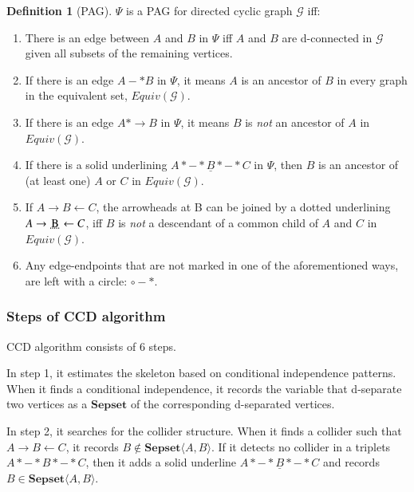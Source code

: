 \documentclass[11pt]{article}
\newcommand{\udensdot}[1]{%
    \tikz[baseline=(todotted.base)]{
        \node[inner sep=1pt,outer sep=0pt] (todotted) {#1};
        \draw[densely dotted, thick] (todotted.south west) -- (todotted.south east);
    }%
}%
\theoremstyle{definition}
\newtheorem{definition}{Definition}
\begin{document}
\begin{definition} [PAG] \label{def: def2}
$\Psi$ is a PAG for directed cyclic graph $\mathcal{G}$ iff:
\begin{enumerate}[nolistsep]
    \item There is an edge between $A$ and $B$ in $\Psi$ iff $A$ and $B$ are d-connected in $\mathcal{G}$ given all subsets of the remaining vertices.
    
    \item If there is an edge $A -* B$ in $\Psi$, it means $A$ is an ancestor of $B$ in every graph in the equivalent set, $Equiv(\mathcal{G})$.

    \item If there is an edge $A *\rightarrow B$ in $\Psi$, it means $B$ is \textit{not} an ancestor of $A$ in $Equiv(\mathcal{G})$.

    \item If there is a solid underlining $A *-* \underline{B}*-*C$ in $\Psi$, then $B$ is an ancestor of (at least one) $A$ or $C$ in $Equiv(\mathcal{G})$.

    \item If $A \rightarrow B \leftarrow C$, the arrowheads at B can be joined by a dotted underlining $A \rightarrow \udensdot{B} \leftarrow C$, iff $B$ is \textit{not} a descendant of a common child of $A$ and $C$ in $Equiv(\mathcal{G})$.

    \item Any edge-endpoints that are not marked in one of the aforementioned ways, are left with a circle: $\circ-*$.
    
\end{enumerate}
\end{definition}

\subsubsection{Steps of CCD algorithm}
CCD algorithm consists of 6 steps.

In step 1, it estimates the skeleton based on conditional independence patterns. When it finds a conditional independence, it records the variable that d-separate two vertices as a $\mathbf{Sepset}$ of the corresponding d-separated vertices. 

In step 2, it searches for the collider structure. When it finds a collider such that $A \rightarrow B \leftarrow C$, it records $B \notin \mathbf{Sepset}\langle A, B \rangle$. If it detects no collider in a triplets $A *-*B*-*C$, then it adds a solid underline  $A *-* \underline{B}*-*C$ and records $B \in \mathbf{Sepset}\langle A, B \rangle$.
\end{document}

